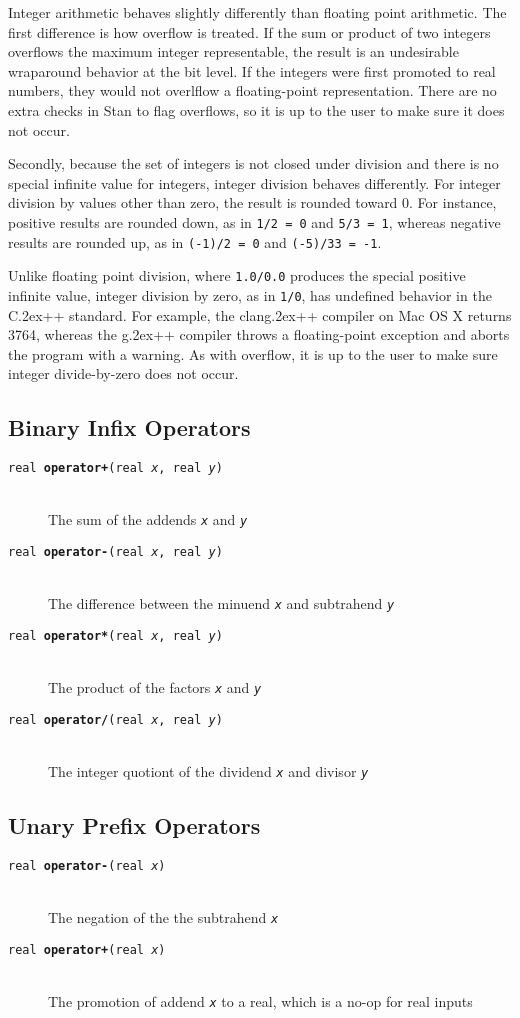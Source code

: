 \documentclass[10pt]{report}
\newcommand{\Stan}{Stan\xspace}
\newcommand*{\Cpp}{C\raise.2ex\hbox{\footnotesize ++}\xspace} %
\newcommand{\clang}{{\ttfamily clang\raise.2ex\hbox{\footnotesize ++}}\xspace}
\newcommand{\gpp}{{\ttfamily g\raise.2ex\hbox{\footnotesize ++}}\xspace}
\newcommand{\code}[1]{{\tt #1}}
\newcommand{\fitem}[4]{\item[{\tt #1 {\bfseries #2}(#3)}]\mbox{ } \\[4pt] #4}
\newcommand{\farg}[1]{{\tt\slshape #1}}
\begin{document}
Integer arithmetic behaves slightly differently than floating point
arithmetic.  The first difference is how overflow is treated.  If the
sum or product of two integers overflows the maximum integer
representable, the result is an undesirable wraparound behavior at the
bit level.  If the integers were first promoted to real numbers, they
would not overlflow a floating-point representation.  There are no
extra checks in \Stan to flag overflows, so it is up to the user to
make sure it does not occur.

Secondly, because the set of integers is not closed under division and
there is no special infinite value for integers, integer division
behaves differently.  For integer division by values other than zero,
the result is rounded toward 0.  For instance, positive results are
rounded down, as in \code{1/2 = 0} and \code{5/3 = 1}, whereas
negative results are rounded up, as in \code{(-1)/2 = 0} and
\code{(-5)/33 = -1}.

Unlike floating point division, where \code{1.0/0.0} produces the
special positive infinite value, integer division by zero, as in
\code{1/0}, has undefined behavior in the \Cpp standard.  For example,
the \clang compiler on Mac OS X returns 3764, whereas the \gpp
compiler throws a floating-point exception and aborts the program with
a warning.  As with overflow, it is up to the user to make sure
integer divide-by-zero does not occur.

\subsection{Binary Infix Operators}

\begin{description}
%
\fitem{real}{operator+}{real \farg{x}, real \farg{y}}{
The sum of the addends \farg{x} and \farg{y}}
%
\fitem{real}{operator-}{real \farg{x}, real \farg{y}}{
The difference between the minuend \farg{x} and subtrahend \farg{y}}
%
\fitem{real}{operator*}{real \farg{x}, real \farg{y}}{
The product of the factors \farg{x} and \farg{y}}
%
\fitem{real}{operator/}{real \farg{x}, real \farg{y}}{
The integer quotiont of the dividend \farg{x} and divisor \farg{y}}
%
\end{description}

\subsection{Unary Prefix Operators}

\begin{description}
\fitem{real}{operator-}{real \farg{x}}{
The negation of the the subtrahend \farg{x}}

\fitem{real}{operator+}{real \farg{x}}{
The promotion of addend \farg{x} to a real, which is a no-op
for real inputs}
\end{description}
\end{document}
